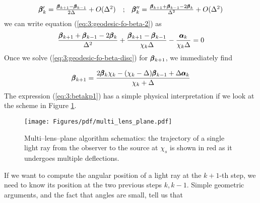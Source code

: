 \begin{equation}
\label{eq:3:finitediff}
\begin{matrix}
\pmb{\beta}'_k = \frac{\pmb{\beta}_{k+1}-\pmb{\beta}_{k-1}}{2\Delta} + O(\Delta^2) & ; & \pmb{\beta}''_k = \frac{\pmb{\beta}_{k+1}+\pmb{\beta}_{k-1}-2\pmb{\beta}_k}{\Delta^2} + O(\Delta^2)
\end{matrix}
\end{equation}
%
we can write equation (\ref{eq:3:geodesic-fo-beta-2}) as 
\begin{equation}
\label{eq:3:geodesic-fo-beta-disc}
\frac{\pmb{\beta}_{k+1}+\pmb{\beta}_{k-1}-2\pmb{\beta}_k}{\Delta^2} + \frac{\pmb{\beta}_{k+1}-\pmb{\beta}_{k-1}}{\chi_k\Delta} - \frac{\pmb{\alpha}_k}{\chi_k\Delta} = 0
\end{equation} 
%
Once we solve (\ref{eq:3:geodesic-fo-beta-disc}) for $\pmb{\beta}_{k+1}$, we immediately find

\begin{equation}
\label{eq:3:betakp1}
\pmb{\beta}_{k+1} = \frac{2\pmb{\beta}_k\chi_k-(\chi_k-\Delta)\pmb{\beta}_{k-1}+\Delta\pmb{\alpha}_k}{\chi_k+\Delta}
\end{equation}  
%
The expression (\ref{eq:3:betakp1}) has a simple physical interpretation if we look at the scheme in Figure \ref{fig:3:multi-lens-plane}.
\begin{figure}
\begin{center}
\texttt{[image: Figures/pdf/multi\_lens\_plane.pdf]}
\end{center}
\caption{Multi--lens--plane algorithm schematics: the trajectory of a single light ray from the observer to the source at $\chi_s$ is shown in red as it undergoes multiple deflections.}
\label{fig:3:multi-lens-plane}
\end{figure}
%
If we want to compute the angular position of a light ray at the $k+1$-th step, we need to know its position at the two previous steps $k,k-1$. Simple geometric arguments, and the fact that angles are small, tell us that 


